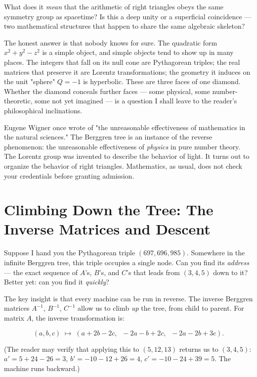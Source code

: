 What does it \textit{mean} that the arithmetic of right triangles obeys the same symmetry group as spacetime? Is this a deep unity or a superficial coincidence --- two mathematical structures that happen to share the same algebraic skeleton?

The honest answer is that nobody knows for sure. The quadratic form $x^2 + y^2 - z^2$ is a simple object, and simple objects tend to show up in many places. The integers that fall on its null cone are Pythagorean triples; the real matrices that preserve it are Lorentz transformations; the geometry it induces on the unit "sphere" $Q = -1$ is hyperbolic. These are three faces of one diamond. Whether the diamond conceals further faces --- some physical, some number-theoretic, some not yet imagined --- is a question I shall leave to the reader's philosophical inclinations.

Eugene Wigner once wrote of "the unreasonable effectiveness of mathematics in the natural sciences." The Berggren tree is an instance of the reverse phenomenon: the unreasonable effectiveness of \textit{physics} in pure number theory. The Lorentz group was invented to describe the behavior of light. It turns out to organize the behavior of right triangles. Mathematics, as usual, does not check your credentials before granting admission.


\ornbreak



\section{Climbing Down the Tree: The Inverse Matrices and Descent}


Suppose I hand you the Pythagorean triple $(697, 696, 985)$. Somewhere in the infinite Berggren tree, this triple occupies a single node. Can you find its \textit{address} --- the exact sequence of $A$'s, $B$'s, and $C$'s that leads from $(3, 4, 5)$ down to it? Better yet: can you find it \textit{quickly}?

The key insight is that every machine can be run in reverse. The inverse Berggren matrices $A^{-1}$, $B^{-1}$, $C^{-1}$ allow us to climb \textit{up} the tree, from child to parent. For matrix $A$, the inverse transformation is:

\[
(a, b, c) \;\longmapsto\; (a + 2b - 2c,\;\; -2a - b + 2c,\;\; -2a - 2b + 3c).
\]

(The reader may verify that applying this to $(5, 12, 13)$ returns us to $(3, 4, 5)$: $a' = 5 + 24 - 26 = 3$, $b' = -10 - 12 + 26 = 4$, $c' = -10 - 24 + 39 = 5$. The machine runs backward.)

